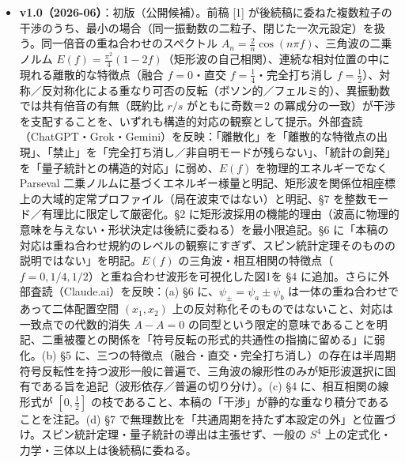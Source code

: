 \documentclass[
]{ltjsarticle}
\providecommand{\tightlist}{%
  \setlength{\itemsep}{0pt}\setlength{\parskip}{0pt}}
\begin{document}
\begin{itemize}
\tightlist
\item
  \textbf{v1.0（2026-06）}：初版（公開候補）。前稿 {[}1{]}
  が後続稿に委ねた複数粒子の干渉のうち、最小の場合（同一振動数の二粒子、閉じた一次元設定）を扱う。同一倍音の重ね合わせのスペクトル
  \(A_n=\tfrac{2}{n}\cos(n\pi f)\)、三角波の二乗ノルム
  \(E(f)=\tfrac{\pi^2}{4}(1-2f)\)（矩形波の自己相関）、連続な相対位置の中に現れる離散的な特徴点（融合
  \(f{=}0\)・直交 \(f{=}\tfrac14\)・完全打ち消し
  \(f{=}\tfrac12\)）、対称／反対称化による重なり可否の反転（ボソン的／フェルミ的）、異振動数では共有倍音の有無（既約比
  \(r/s\) がともに奇数＝\(2\)
  の冪成分の一致）が干渉を支配することを、いずれも構造的対応の観察として提示。外部査読（ChatGPT・Grok・Gemini）を反映：「離散化」を「離散的な特徴点の出現」、「禁止」を「完全打ち消し／非自明モードが残らない」、「統計の創発」を「量子統計との構造的対応」に弱め、\(E(f)\)
  を物理的エネルギーでなく Parseval
  二乗ノルムに基づくエネルギー様量と明記、矩形波を関係位相座標上の大域的定常プロファイル（局在波束ではない）と明記、§7
  を整数モード／有理比に限定して厳密化。§2
  に矩形波採用の機能的理由（波高に物理的意味を与えない・形状決定は後続に委ねる）を最小限追記。§6
  に「本稿の対応は重ね合わせ規約のレベルの観察にすぎず、スピン統計定理そのものの説明ではない」を明記。\(E(f)\)
  の三角波・相互相関の特徴点（\(f=0,1/4,1/2\)）と重ね合わせ波形を可視化した図1を
  §4 に追加。さらに外部査読（Claude.ai）を反映：(a) §6
  に、\(\psi_\pm=\psi_a\pm\psi_b\)
  は一体の重ね合わせであって二体配置空間 \((x_1,x_2)\)
  上の反対称化そのものではないこと、対応は一致点での代数的消失 \(A-A=0\)
  の同型という限定的意味であることを明記、二重被覆との関係を「符号反転の形式的共通性の指摘に留める」に弱化。(b)
  §5
  に、三つの特徴点（融合・直交・完全打ち消し）の存在は半周期符号反転性を持つ波形一般に普遍で、三角波の線形性のみが矩形波選択に固有である旨を追記（波形依存／普遍の切り分け）。(c)
  §4 に、相互相関の線形式が \([0,\tfrac12]\)
  の枝であること、本稿の「干渉」が静的な重なり積分であることを注記。(d)
  §7
  で無理数比を「共通周期を持たず本設定の外」と位置づけ。スピン統計定理・量子統計の導出は主張せず、一般の
  \(S^4\) 上の定式化・力学・三体以上は後続稿に委ねる。
\end{itemize}
\end{document}
